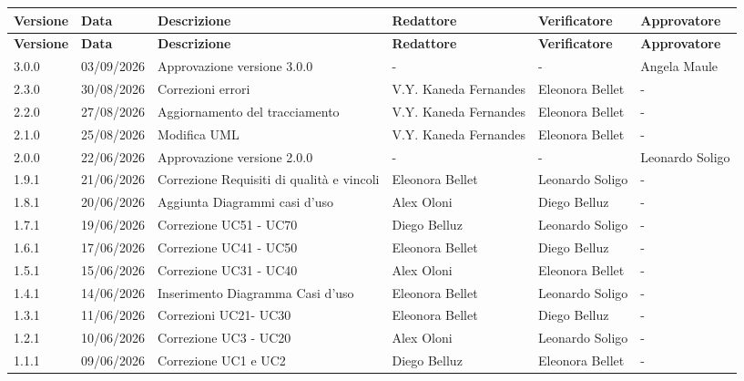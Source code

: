 ﻿\documentclass[a4paper,12pt]{article}
\begin{document}
\renewcommand{\arraystretch}{1.35}
{\small
\setlength{\LTleft}{0pt}
\setlength{\LTright}{0pt}
\begin{longtable}{|p{1.2cm}|p{1.9cm}|p{4.3cm}|p{2.8cm}|p{2.1cm}|p{2.1cm}|}
    \hline
    \rowcolor{gray!20}
    \textbf{Versione} & \textbf{Data} & \textbf{Descrizione} & \textbf{Redattore} & \textbf{Verificatore} & \textbf{Approvatore} \\
    \hline
    \endfirsthead
    \hline
    \rowcolor{gray!20}
    \textbf{Versione} & \textbf{Data} & \textbf{Descrizione} & \textbf{Redattore} & \textbf{Verificatore} & \textbf{Approvatore} \\
    \hline
    \endhead
     3.0.0 & 03/09/2026 & Approvazione versione 3.0.0 & - & - & Angela Maule \\
    \hline
    2.3.0 & 30/08/2026 & Correzioni errori & V.Y. Kaneda Fernandes & Eleonora Bellet & - \\
    \hline
    2.2.0 & 27/08/2026 & Aggiornamento del tracciamento & V.Y. Kaneda Fernandes & Eleonora Bellet & -\\
    \hline
    2.1.0 & 25/08/2026 & Modifica UML & V.Y. Kaneda Fernandes & Eleonora Bellet & - \\
    \hline
    2.0.0 & 22/06/2026 & Approvazione versione 2.0.0 & - & - & Leonardo Soligo \\
    \hline
    1.9.1 & 21/06/2026 & Correzione Requisiti di qualità e vincoli & Eleonora Bellet & Leonardo Soligo & - \\
    \hline 
    1.8.1 & 20/06/2026 & Aggiunta Diagrammi casi d'uso & Alex Oloni & Diego Belluz & - \\
    \hline
    1.7.1 & 19/06/2026 & Correzione UC51 - UC70 & Diego Belluz & Leonardo Soligo & - \\
    \hline
    1.6.1 & 17/06/2026 & Correzione UC41 - UC50 & Eleonora Bellet & Diego Belluz & - \\
    \hline
    1.5.1 & 15/06/2026 & Correzione UC31 - UC40 & Alex Oloni & Eleonora Bellet & - \\
    \hline 
    1.4.1 & 14/06/2026 & Inserimento Diagramma Casi d'uso & Eleonora Bellet & Leonardo Soligo & - \\
    \hline 
    1.3.1 & 11/06/2026 & Correzioni UC21- UC30 & Eleonora Bellet & Diego Belluz & - \\
    \hline
    1.2.1 & 10/06/2026 & Correzione UC3 - UC20 & Alex Oloni & Leonardo Soligo & - \\
    \hline
    1.1.1 & 09/06/2026 & Correzione UC1 e UC2 & Diego Belluz & Eleonora Bellet & - \\

\end{longtable}}
\end{document}
